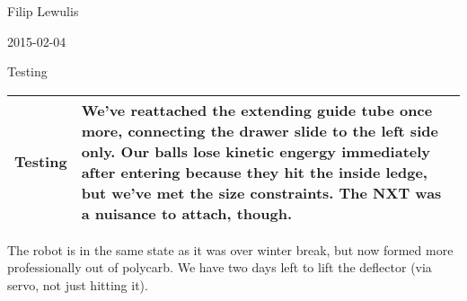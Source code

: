Filip Lewulis

2015-02-04

Testing

\begin{tabular}{|p{5cm}|p{5cm}|}
  \hline Testing &
We've reattached the extending guide tube once more, connecting the drawer slide to the left side only. Our balls lose kinetic engergy immediately after entering because they hit the inside ledge, but we've met the size constraints. The NXT was a nuisance to attach, though. \\
\hline
\end{tabular}
The robot is in the same state as it was over winter break, but now formed more professionally out of polycarb. We have two days left to lift the deflector (via servo, not just hitting it).
